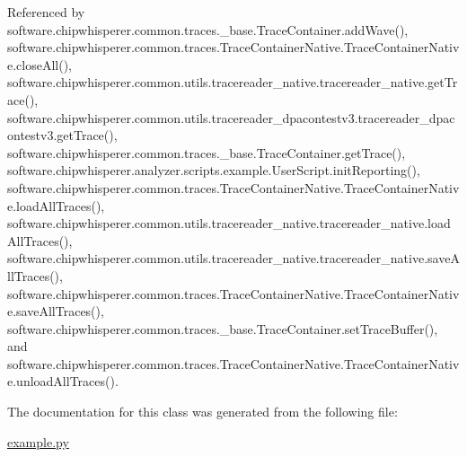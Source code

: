 Referenced by software.\+chipwhisperer.\+common.\+traces.\+\_\+base.\+Trace\+Container.\+add\+Wave(), software.\+chipwhisperer.\+common.\+traces.\+Trace\+Container\+Native.\+Trace\+Container\+Native.\+close\+All(), software.\+chipwhisperer.\+common.\+utils.\+tracereader\+\_\+native.\+tracereader\+\_\+native.\+get\+Trace(), software.\+chipwhisperer.\+common.\+utils.\+tracereader\+\_\+dpacontestv3.\+tracereader\+\_\+dpacontestv3.\+get\+Trace(), software.\+chipwhisperer.\+common.\+traces.\+\_\+base.\+Trace\+Container.\+get\+Trace(), software.\+chipwhisperer.\+analyzer.\+scripts.\+example.\+User\+Script.\+init\+Reporting(), software.\+chipwhisperer.\+common.\+traces.\+Trace\+Container\+Native.\+Trace\+Container\+Native.\+load\+All\+Traces(), software.\+chipwhisperer.\+common.\+utils.\+tracereader\+\_\+native.\+tracereader\+\_\+native.\+load\+All\+Traces(), software.\+chipwhisperer.\+common.\+utils.\+tracereader\+\_\+native.\+tracereader\+\_\+native.\+save\+All\+Traces(), software.\+chipwhisperer.\+common.\+traces.\+Trace\+Container\+Native.\+Trace\+Container\+Native.\+save\+All\+Traces(), software.\+chipwhisperer.\+common.\+traces.\+\_\+base.\+Trace\+Container.\+set\+Trace\+Buffer(), and software.\+chipwhisperer.\+common.\+traces.\+Trace\+Container\+Native.\+Trace\+Container\+Native.\+unload\+All\+Traces().



The documentation for this class was generated from the following file\+:\begin{DoxyCompactItemize}
\item 
\hyperlink{example_8py}{example.\+py}\end{DoxyCompactItemize}
